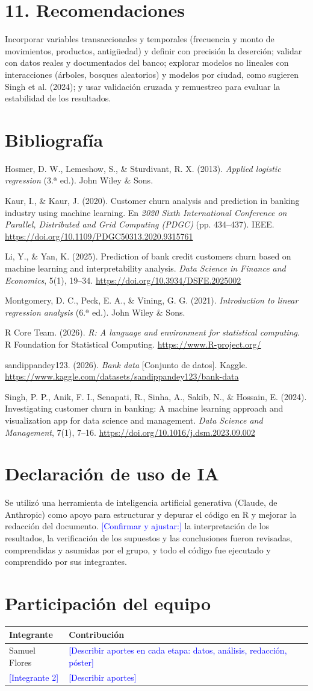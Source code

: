 \documentclass[a4,11pt]{aleph-notas}
\newcommand{\nv}[1]{\textcolor{blue}{#1}}   %
\newcommand{\apa}[1]{\par\hangindent=1.0cm\hangafter=1 #1\par}
\begin{document}
\section*{11. Recomendaciones}
Incorporar variables transaccionales y temporales (frecuencia y monto de movimientos, productos, antigüedad) y definir con precisión la deserción; validar con datos reales y documentados del banco; explorar modelos no lineales con interacciones (árboles, bosques aleatorios) y modelos por ciudad, como sugieren Singh et al. (2024); y usar validación cruzada y remuestreo para evaluar la estabilidad de los resultados.

\section*{Bibliografía}
\apa{Hosmer, D. W., Lemeshow, S., \& Sturdivant, R. X. (2013). \emph{Applied logistic regression} (3.ª ed.). John Wiley \& Sons.}
\apa{Kaur, I., \& Kaur, J. (2020). Customer churn analysis and prediction in banking industry using machine learning. En \emph{2020 Sixth International Conference on Parallel, Distributed and Grid Computing (PDGC)} (pp. 434--437). IEEE. \url{https://doi.org/10.1109/PDGC50313.2020.9315761}}
\apa{Li, Y., \& Yan, K. (2025). Prediction of bank credit customers churn based on machine learning and interpretability analysis. \emph{Data Science in Finance and Economics}, 5(1), 19--34. \url{https://doi.org/10.3934/DSFE.2025002}}
\apa{Montgomery, D. C., Peck, E. A., \& Vining, G. G. (2021). \emph{Introduction to linear regression analysis} (6.ª ed.). John Wiley \& Sons.}
\apa{R Core Team. (2026). \emph{R: A language and environment for statistical computing}. R Foundation for Statistical Computing. \url{https://www.R-project.org/}}
\apa{sandippandey123. (2026). \emph{Bank data} [Conjunto de datos]. Kaggle. \url{https://www.kaggle.com/datasets/sandippandey123/bank-data}}
\apa{Singh, P. P., Anik, F. I., Senapati, R., Sinha, A., Sakib, N., \& Hossain, E. (2024). Investigating customer churn in banking: A machine learning approach and visualization app for data science and management. \emph{Data Science and Management}, 7(1), 7--16. \url{https://doi.org/10.1016/j.dsm.2023.09.002}}

\section*{Declaración de uso de IA}
Se utilizó una herramienta de inteligencia artificial generativa (Claude, de Anthropic) como apoyo para estructurar y depurar el código en R y mejorar la redacción del documento. \nv{[Confirmar y ajustar:]} la interpretación de los resultados, la verificación de los supuestos y las conclusiones fueron revisadas, comprendidas y asumidas por el grupo, y todo el código fue ejecutado y comprendido por sus integrantes.

\section*{Participación del equipo}
\begin{tabular}{p{5.2cm}p{9.5cm}}
\toprule
Integrante & Contribución \\
\midrule
Samuel Flores & \nv{[Describir aportes en cada etapa: datos, análisis, redacción, póster]} \\
\nv{[Integrante 2]} & \nv{[Describir aportes]} \\
\bottomrule
\end{tabular}
\end{document}
